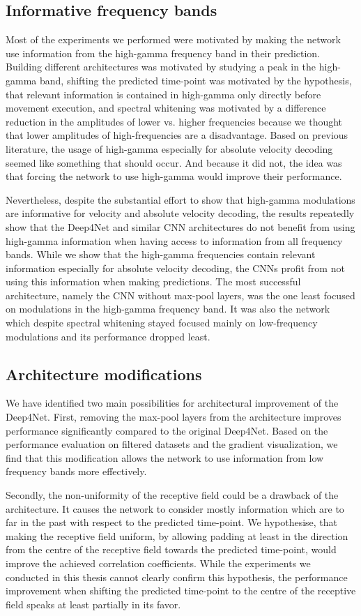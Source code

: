 \subsection*{Informative frequency bands}
Most of the experiments we performed were motivated by making the network use information from the high-gamma frequency band in their prediction.
Building different architectures was motivated by studying a peak in the high-gamma band, shifting the predicted time-point was motivated by the hypothesis, that relevant information is contained in high-gamma only directly before movement execution, and spectral whitening was motivated by a difference reduction in the amplitudes of lower vs. higher frequencies because we thought that lower amplitudes of high-frequencies are a disadvantage.
Based on previous literature, the usage of high-gamma especially for absolute velocity decoding seemed like something that should occur.
And because it did not, the idea was that forcing the network to use high-gamma would improve their performance.

Nevertheless, despite the substantial effort to show that high-gamma modulations are informative for velocity and absolute velocity decoding, the results repeatedly show that the Deep4Net and similar CNN architectures do not benefit from using high-gamma information when having access to information from all frequency bands.
While we show that the high-gamma frequencies contain relevant information especially for absolute velocity decoding, the CNNs profit from not using this information when making predictions.
The most successful architecture, namely the CNN without max-pool layers, was the one least focused on modulations in the high-gamma frequency band.
It was also the network which despite spectral whitening stayed focused mainly on low-frequency modulations and its performance dropped least.

\subsection*{Architecture modifications}
We have identified two main possibilities for architectural improvement of the Deep4Net. 
First, removing the max-pool layers from the architecture improves performance significantly compared to the original Deep4Net. 
Based on the performance evaluation on filtered datasets and the gradient visualization, we find that this modification allows the network to use information from low frequency bands more effectively. 

Secondly, the non-uniformity of the receptive field could be a drawback of the architecture.
It causes the network to consider mostly information which are to far in the past with respect to the predicted time-point.
We hypothesise, that making the receptive field uniform, by allowing padding at least in the direction from the centre of the receptive field towards the predicted time-point, would improve the achieved correlation coefficients.
While the experiments we conducted in this thesis cannot clearly confirm this hypothesis, the performance improvement when shifting the predicted time-point to the centre of the receptive field speaks at least partially in its favor. 


